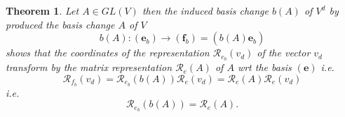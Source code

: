 \documentclass[aps,preprint]{revtex4}%
\newtheorem{theorem}{Theorem}
\begin{document}
\begin{theorem}
Let $A\in GL\left(  V\right)  $ then the induced basis change $b\left(
A\right)  $ of $V^{d}$ by produced the basis change $A$ of $V$
\begin{equation}
b\left(  A\right)  :\left(  \boldsymbol{e}_{b}\right)  \rightarrow\left(
\boldsymbol{f}_{b}\right)  =\left(  \overset{}{b\left(  A\right)
\boldsymbol{e}_{b}}\right)
\end{equation}
shows that the coordinates of the representation $\mathcal{R}_{e_{b}}\left(
v_{d}\right)  $ of the vector $v_{d}$ transform by the matrix representation
$\mathcal{R}_{e}\left(  A\right)  $ of $A$ wrt the basis $\left(
\boldsymbol{e}\right)  $ i.e.
\begin{equation}
\mathcal{R}_{f_{b}}\left(  v_{d}\right)  =\mathcal{R}_{e_{b}}\left(  b\left(
A\right)  \right)  \mathcal{R}_{e}\left(  v_{d}\right)  =\mathcal{R}%
_{e}\left(  A\right)  \mathcal{R}_{e}\left(  v_{d}\right)
\end{equation}
i.e.%
\begin{equation}
\mathcal{R}_{e_{b}}\left(  b\left(  A\right)  \right)  =\mathcal{R}_{e}\left(
A\right)  .
\end{equation}

\end{theorem}
\end{document}
